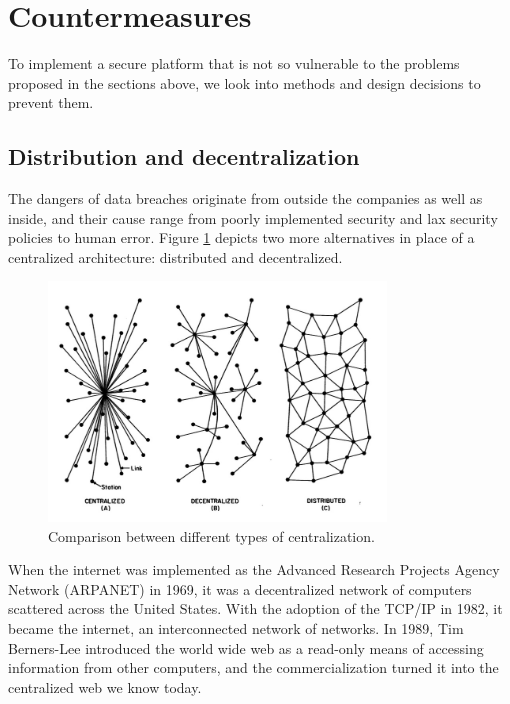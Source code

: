 \section{Countermeasures}
To implement a secure platform that is not so vulnerable to the problems proposed in the sections above, we look into methods and design decisions to prevent them.
\subsection{Distribution and decentralization}
The dangers of data breaches originate from outside the companies as well as inside, and their cause range from poorly implemented security and lax security policies to human error. 
Figure \ref{fig:comparison} depicts two more alternatives in place of a centralized architecture: distributed and decentralized.

\begin{figure}[htpb]
  \centering
  \includegraphics[width=0.8\textwidth]{figures/comparison.jpg}
  \caption{Comparison between different types of centralization.} \label{fig:comparison}
\end{figure}

When the internet was implemented as the Advanced Research Projects Agency Network (ARPANET) in 1969, it was a decentralized network of computers scattered across the United States. With the adoption of the TCP/IP in 1982, it became the internet, an interconnected network of networks.
In 1989, Tim Berners-Lee introduced the world wide web as a read-only means of accessing information from other computers, and the commercialization turned it into the centralized web we know today. 

